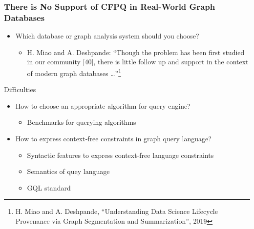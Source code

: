 \documentclass[xcolor=table,aspectratio=169]{beamer}
\begin{document}
\begin{frame}[fragile]
  \frametitle{There is No Support of CFPQ in Real-World Graph Databases}
  \begin{itemize}        
    \item[\faQuestion] Which database or graph analysis system should you choose?  
    \begin{itemize}
      \item[\faFrown] H. Miao and A. Deshpande: ``Though the problem has been first studied in our community [40], there is little follow up and support in the context of modern graph databases \dots''\footnote{H. Miao and A. Deshpande,  ``Understanding Data Science Lifecycle Provenance via Graph Segmentation and Summarization'', 2019}       
    \end{itemize}
  \end{itemize}
  \vfill
  Difficulties
  \begin{itemize}        
    \item[\faQuestion] How to choose an appropriate algorithm for query engine?
    \begin{itemize}
      \item[\faGears] Benchmarks for querying algorithms
    \end{itemize}
    \item[\faQuestion] How to express context-free constraints in graph query language? 
    \begin{itemize}
      \item[\faQuestion] Syntactic features to express context-free language constraints
      \item[\faQuestion] Semantics of quey language
      \pause 
      \item[\faGears] GQL standard  
    \end{itemize}
  \end{itemize}  
\end{frame}
\end{document}
